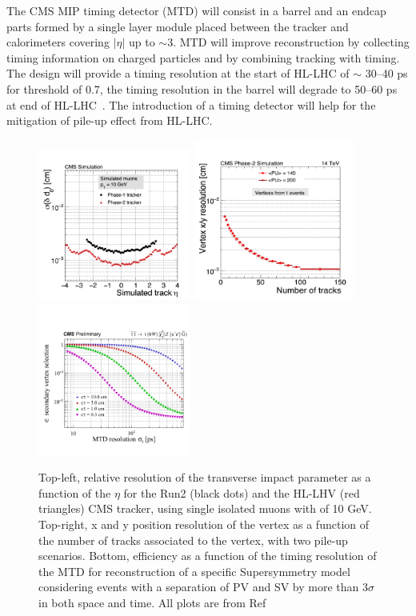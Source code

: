 The CMS MIP timing detector (MTD) will
consist in a barrel and an endcap parts formed by a single layer
module placed between the tracker
and calorimeters covering $|\eta|$ up to $\sim$3.
MTD will improve reconstruction by collecting timing information on
charged particles and by combining tracking with timing. The design will provide a timing resolution
at the start of HL-LHC of $\sim$ 30--40 ps for \pt threshold of
0.7\GeV, the timing resolution in the barrel will degrade to 50--60 ps
at end of HL-LHC~\cite{Marta}. The introduction of a timing detector will help for
the mitigation of pile-up effect from HL-LHC.
\begin{figure}[h]
\centering
    \includegraphics[clip,trim=0.5cm 0cm 0.cm 1.8cm, height =5cm]{Figures/c7/IPrel.pdf}
    \includegraphics[clip,trim=0.5cm 0cm 0.cm 1.3cm, height = 5.3cm]{Figures/c7/vertexrel.pdf}\\
    \includegraphics[clip,trim=0.5cm 1cm 0.cm 3cm, height = 5cm]{Figures/c7/MDT.pdf}
\caption{Top-left, relative resolution of the transverse impact
parameter as a function of the $\eta$ for the Run2 (black dots) and the
HL-LHV (red triangles) CMS tracker, using single isolated muons with
\pt of 10 GeV. Top-right, x and y position resolution of the vertex as a function of the
number of tracks associated to the vertex, with two pile-up scenarios. 
 Bottom, efficiency as a function of the timing
resolution of the MTD for reconstruction of a specific Supersymmetry
model considering events with a separation of
PV and SV by more than 3$\sigma$ in both space and time. All plots are
  from Ref~\cite{Alimena_2020}}
\label{fig:MDT_alimena}
\end{figure}


